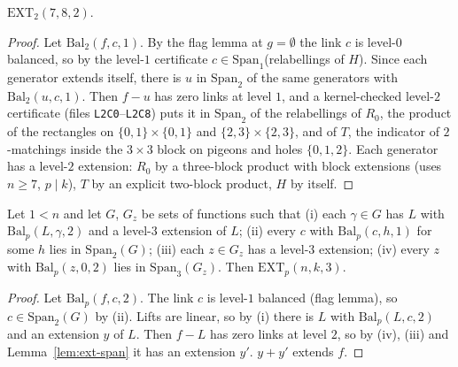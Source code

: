 \begin{lemma}[level 2]\label{lem:C2}
$\mathrm{EXT}_2(7,8,2)$.
\end{lemma}

\begin{proof}
Let $\mathrm{Bal}_2(f,c,1)$.  By the flag lemma at $g=\emptyset$ the link $c$ is
level-$0$ balanced, so by the
level-$1$ certificate $c\in\mathrm{Span}_1$(relabellings of $H$).  Since each
generator extends itself, there is $u$ in $\mathrm{Span}_2$ of the same generators
with $\mathrm{Bal}_2(u,c,1)$.  Then $f-u$ has zero links at
level $1$, and a kernel-checked level-$2$ certificate (files \texttt{L2C0}--\texttt{L2C8})
puts it in $\mathrm{Span}_2$ of the relabellings of $R_0$, the product of the
rectangles on $\{0,1\}\times\{0,1\}$ and $\{2,3\}\times\{2,3\}$, and of $T$, the
indicator of $2$-matchings inside the $3\times3$ block on pigeons and holes
$\{0,1,2\}$.
Each generator has a level-$2$ extension: $R_0$ by a three-block product with
block extensions (uses $n\ge7$, $p\mid k$), $T$ by an explicit two-block product,
$H$ by itself.
\end{proof}

\begin{lemma}\label{lem:C-lift}
Let $1<n$ and let $G$, $G_z$ be sets of functions such that
(i) each $\gamma\in G$ has $L$ with $\mathrm{Bal}_p(L,\gamma,2)$ and a level-$3$
extension of $L$;
(ii) every $c$ with $\mathrm{Bal}_p(c,h,1)$ for some $h$ lies in $\mathrm{Span}_2(G)$;
(iii) each $z\in G_z$ has a level-$3$ extension;
(iv) every $z$ with $\mathrm{Bal}_p(z,0,2)$ lies in $\mathrm{Span}_3(G_z)$.
Then $\mathrm{EXT}_p(n,k,3)$.
\end{lemma}

\begin{proof}
Let $\mathrm{Bal}_p(f,c,2)$.  The link $c$ is level-$1$ balanced (flag lemma), so
$c\in\mathrm{Span}_2(G)$ by (ii).  Lifts are linear, so by (i) there is $L$ with
$\mathrm{Bal}_p(L,c,2)$ and an extension $y$ of $L$.  Then $f-L$ has zero links at
level $2$, so by (iv), (iii) and Lemma~\ref{lem:ext-span} it has an extension $y'$.
$y+y'$ extends $f$.
\end{proof}

